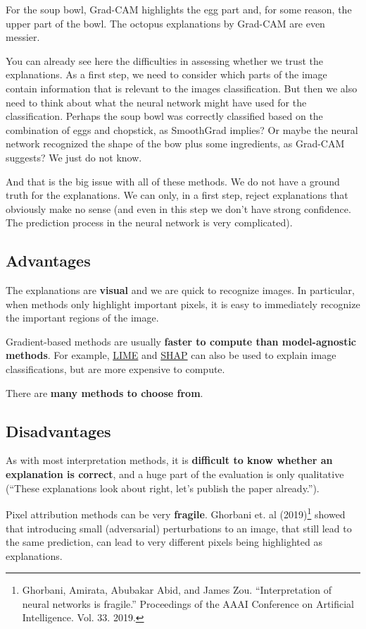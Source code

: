 \documentclass[12pt,]{krantz}
\begin{document}
For the soup bowl, Grad-CAM highlights the egg part and, for some
reason, the upper part of the bowl. The octopus explanations by Grad-CAM
are even messier.

You can already see here the difficulties in assessing whether we trust
the explanations. As a first step, we need to consider which parts of
the image contain information that is relevant to the images
classification. But then we also need to think about what the neural
network might have used for the classification. Perhaps the soup bowl
was correctly classified based on the combination of eggs and chopstick,
as SmoothGrad implies? Or maybe the neural network recognized the shape
of the bow plus some ingredients, as Grad-CAM suggests? We just do not
know.

And that is the big issue with all of these methods. We do not have a
ground truth for the explanations. We can only, in a first step, reject
explanations that obviously make no sense (and even in this step we
don't have strong confidence. The prediction process in the neural
network is very complicated).

\subsection{Advantages}\label{advantages-19}

The explanations are \textbf{visual} and we are quick to recognize
images. In particular, when methods only highlight important pixels, it
is easy to immediately recognize the important regions of the image.

Gradient-based methods are usually \textbf{faster to compute than
model-agnostic methods}. For example, \protect\hyperlink{lime}{LIME} and
\protect\hyperlink{shap}{SHAP} can also be used to explain image
classifications, but are more expensive to compute.

There are \textbf{many methods to choose from}.

\subsection{Disadvantages}\label{disadvantages-19}

As with most interpretation methods, it is \textbf{difficult to know
whether an explanation is correct}, and a huge part of the evaluation is
only qualitative (``These explanations look about right, let's publish
the paper already.'').

Pixel attribution methods can be very \textbf{fragile}. Ghorbani et. al
(2019)\footnote{Ghorbani, Amirata, Abubakar Abid, and James Zou.
  ``Interpretation of neural networks is fragile.'' Proceedings of the
  AAAI Conference on Artificial Intelligence. Vol. 33. 2019.} showed
that introducing small (adversarial) perturbations to an image, that
still lead to the same prediction, can lead to very different pixels
being highlighted as explanations.
\end{document}
